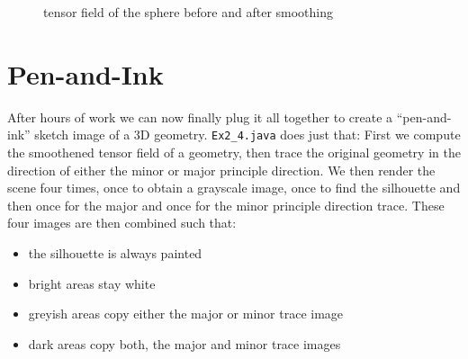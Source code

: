 \documentclass[a4paper,10pt,notitlepage]{scrreprt}
\begin{document}
\begin{figure}
 \caption{tensor field of the sphere before and after smoothing}
 \label{fig:smooth-scheme-curvature-tensor}
\end{figure}

\chapter{Pen-and-Ink}

After hours of work we can now finally plug it all together to create a
``pen-and-ink'' sketch image of a 3D geometry. \texttt{Ex2\_4.java} does just
that: First we compute the smoothened tensor field of a geometry, then trace
the original geometry in the direction of either the minor or major principle
direction. We then render the scene four times, once to obtain a grayscale
image, once to find the silhouette and then once for the major and once for the
minor principle direction trace. These four images are then combined such that:

\begin{itemize}
 \item the silhouette is always painted
 \item bright areas stay white
 \item greyish areas copy either the major or minor trace image
 \item dark areas copy both, the major and minor trace images
\end{itemize}
\end{document}
